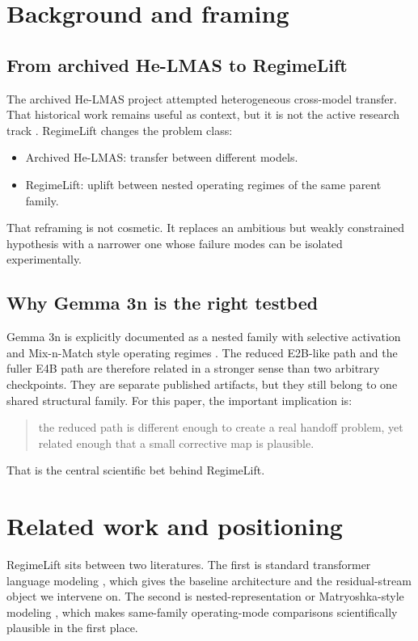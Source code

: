 \documentclass[11pt]{article}
\begin{document}
\section{Background and framing}
\subsection{From archived He-LMAS to RegimeLift}
The archived He-LMAS project attempted heterogeneous cross-model transfer. That historical work remains useful as context, but it is not the active research track \cite{helmasLegacy2026}. RegimeLift changes the problem class:
\begin{itemize}[leftmargin=1.4em]
    \item Archived He-LMAS: transfer between different models.
    \item RegimeLift: uplift between nested operating regimes of the same parent family.
\end{itemize}

That reframing is not cosmetic. It replaces an ambitious but weakly constrained hypothesis with a narrower one whose failure modes can be isolated experimentally.

\subsection{Why Gemma 3n is the right testbed}
Gemma 3n is explicitly documented as a nested family with selective activation and Mix-n-Match style operating regimes \cite{gemma3n2025}. The reduced E2B-like path and the fuller E4B path are therefore related in a stronger sense than two arbitrary checkpoints. They are separate published artifacts, but they still belong to one shared structural family. For this paper, the important implication is:
\begin{quote}
the reduced path is different enough to create a real handoff problem, yet related enough that a small corrective map is plausible.
\end{quote}

That is the central scientific bet behind RegimeLift.

\section{Related work and positioning}
RegimeLift sits between two literatures. The first is standard transformer language modeling \cite{vaswani2017attention}, which gives the baseline architecture and the residual-stream object we intervene on. The second is nested-representation or Matryoshka-style modeling \cite{mrl2022}, which makes same-family operating-mode comparisons scientifically plausible in the first place.
\end{document}
